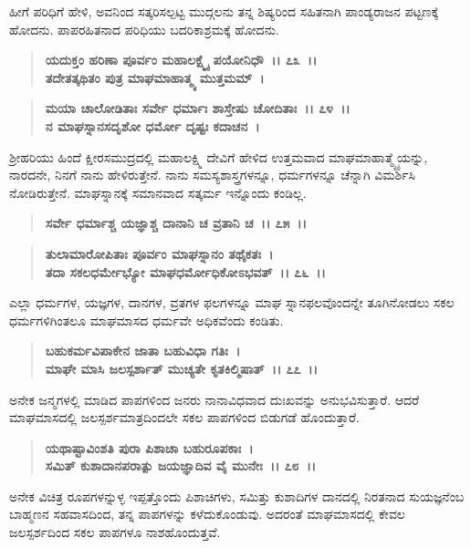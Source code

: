 ಹೀಗೆ ಪರಿಧಿಗೆ ಹೇಳಿ, ಅವನಿಂದ ಸತ್ಕರಿಸಲ್ಪಟ್ಟ ಮುದ್ಗಲನು ತನ್ನ ಶಿಷ್ಯರಿಂದ ಸಹಿತನಾಗಿ ಪಾಂಡ್ಯರಾಜನ ಪಟ್ಟಣಕ್ಕೆ ಹೋದನು. ಪಾಪರಹಿತನಾದ ಪರಿಧಿಯು ಬದರಿಕಾಶ್ರಮಕ್ಕೆ ಹೋದನು.

\begin{verse}
\textbf{ಯದುಕ್ತಂ ಹರಿಣಾ ಪೂರ್ವಂ ಮಹಾಲಕ್ಷ್ಮೈ ಪಯೋನಿಧೌ~।। ೭೩~।।}\\\textbf{ತದೇತತ್ಕಥಿತಂ ಪುತ್ರ ಮಾಘಮಾಹಾತ್ಮ್ಯ ಮುತ್ತಮಮ್~। }
\end{verse}

\begin{verse}
\textbf{ಮಯಾ ಚಾಲೋಡಿತಾಃ ಸರ್ವೇ ಧರ್ಮಾಃ ಶಾಸ್ತೇಷು ಚೋದಿತಾಃ~।। ೭೪~।।}\\\textbf{ನ ಮಾಘಸ್ನಾನಸದೃಶೋ ಧರ್ಮೋ ದೃಷ್ಟಃ ಕದಾಚನ~।}
\end{verse}

ಶ‍್ರೀಹರಿಯು ಹಿಂದೆ ಕ್ಷೀರಸಮುದ್ರದಲ್ಲಿ ಮಹಾಲಕ್ಷ್ಮಿ ದೇವಿಗೆ ಹೇಳಿದ ಉತ್ತಮವಾದ ಮಾಘಮಾಹಾತ್ಮ್ಯೈಯನ್ನು, ನಾರದನೇ, ನಿನಗೆ ನಾನು ಹೇಳಿರುತ್ತೇನೆ. ನಾನು ಸಮಸ್ಯಶಾಸ್ತ್ರಗಳನ್ನೂ, ಧರ್ಮಗಳನ್ನೂ ಚೆನ್ನಾಗಿ ವಿಮರ್ಶಿಸಿ ನೋಡಿರುತ್ತೇನೆ. ಮಾಘಸ್ನಾನಕ್ಕೆ ಸಮಾನವಾದ ಸತ್ಕರ್ಮ ಇನ್ನೊಂದು ಕಂಡಿಲ್ಲ.

\begin{verse}
\textbf{ಸರ್ವೇ ಧರ್ಮಾಶ್ಚ ಯಜ್ಞಾಶ್ಚ ದಾನಾನಿ ಚ ವ್ರತಾನಿ ಚ~।। ೭೫~।।} 
\end{verse}

\begin{verse}
\textbf{ತುಲಾಮಾರೋಪಿತಾಃ ಪೂರ್ವಂ ಮಾಘಸ್ನಾನಂ ತಥೈಕತಃ~।}\\\textbf{ತದಾ ಸಕಲಧರ್ಮೇಭ್ಯೋ ಮಾಘಧರ್ಮೋಧಿಕೋಽಭವತ್~।। ೭೬~।।}
\end{verse}

ಎಲ್ಲಾ ಧರ್ಮಗಳ, ಯಜ್ಞಗಳ, ದಾನಗಳ, ವ್ರತಗಳ ಫಲಗಳನ್ನೂ ಮಾಘ ಸ್ನಾನಫಲವೊಂದನ್ನೇ ತೂಗಿನೋಡಲು ಸಕಲ ಧರ್ಮಗಳಿಗಿಂತಲೂ ಮಾಘಮಾಸದ ಧರ್ಮವೇ ಅಧಿಕವೆಂದು ಕಂಡಿತು.

\begin{verse}
\textbf{ಬಹುಕರ್ಮವಿಪಾಕೇನ ಜಾತಾ ಬಹುವಿಧಾ ಗತಿಃ~।}\\\textbf{ಮಾಘೇ ಮಾಸಿ ಜಲಸ್ಪರ್ಶಾತ್ ಮುಚ್ಯತೇ ಕೃತಕಿಲ್ಮಿಷಾತ್~।। ೭೭~।।}
\end{verse}

ಅನೇಕ ಜನ್ಮಗಳಲ್ಲಿ ಮಾಡಿದ ಪಾಪಗಳಿಂದ ಜನರು ನಾನಾವಿಧವಾದ ದುಃಖವನ್ನು ಅನುಭವಿಸುತ್ತಾರೆ. ಆದರೆ ಮಾಘಮಾಸದಲ್ಲಿ ಜಲಸ್ಪರ್ಶಮಾತ್ರದಿಂದಲೇ ಸಕಲ ಪಾಪಗಳಿಂದ ಬಿಡುಗಡೆ ಹೊಂದುತ್ತಾರೆ.

\begin{verse}
\textbf{ಯಥಾಷ್ಟಾವಿಂಶತಿ ಪುರಾ ಪಿಶಾಚಾ ಬಹುರೂಪಕಾಃ~।}\\\textbf{ಸಮಿತ್ ಕುಶಾದಾನಪರಾತ್ಪು ಜಯಜ್ಞಾದಿವ ವೈ ಮುನೇಃ~।। ೭೮~।।}
\end{verse}

ಅನೇಕ ವಿಚಿತ್ರ ರೂಪಗಳನ್ನುಳ್ಳ ಇಪ್ಪತ್ತೊಂದು ಪಿಶಾಚಿಗಳು, ಸಮಿತ್ತು ಕುಶಾದಿಗಳ ದಾನದಲ್ಲಿ ನಿರತನಾದ ಸುಯಜ್ಞನೆಂಬ ಬಾಹ್ಮಣನ ಸಹವಾಸದಿಂದ, ತನ್ನ ಪಾಪಗಳನ್ನು ಕಳೆದುಕೊಂಡುವು. ಅದರಂತೆ ಮಾಘಮಾಸದಲ್ಲಿ ಕೇವಲ ಜಲಸ್ಪರ್ಶದಿಂದ ಸಕಲ ಪಾಪಗಳೂ ನಾಶಹೊಂದುತ್ತವೆ.

